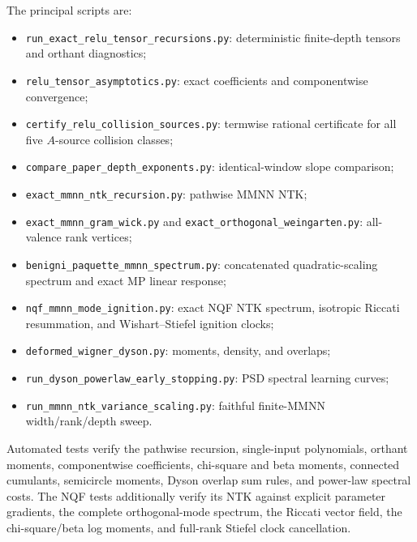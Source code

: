 \documentclass{article}
\begin{document}
The principal scripts are:
\begin{itemize}[leftmargin=1.4em]
\item \texttt{run\_exact\_relu\_tensor\_recursions.py}: deterministic
finite-depth tensors and orthant diagnostics;
\item \texttt{relu\_tensor\_asymptotics.py}: exact coefficients and
componentwise convergence;
\item \texttt{certify\_relu\_collision\_sources.py}: termwise rational
certificate for all five \(A\)-source collision classes;
\item \texttt{compare\_paper\_depth\_exponents.py}: identical-window slope
comparison;
\item \texttt{exact\_mmnn\_ntk\_recursion.py}: pathwise MMNN NTK;
\item \texttt{exact\_mmnn\_gram\_wick.py} and
\texttt{exact\_orthogonal\_weingarten.py}: all-valence rank vertices;
\item \texttt{benigni\_paquette\_mmnn\_spectrum.py}: concatenated
quadratic-scaling spectrum and exact MP linear response;
\item \texttt{nqf\_mmnn\_mode\_ignition.py}: exact NQF NTK spectrum,
isotropic Riccati resummation, and Wishart--Stiefel ignition clocks;
\item \texttt{deformed\_wigner\_dyson.py}: moments, density, and overlaps;
\item \texttt{run\_dyson\_powerlaw\_early\_stopping.py}: PSD spectral
learning curves;
\item \texttt{run\_mmnn\_ntk\_variance\_scaling.py}: faithful finite-MMNN
width/rank/depth sweep.
\end{itemize}
Automated tests verify the pathwise recursion, single-input polynomials,
orthant moments, componentwise coefficients, chi-square and beta moments,
connected cumulants, semicircle moments, Dyson overlap sum rules, and
power-law spectral costs.  The NQF tests additionally verify its NTK against
explicit parameter gradients, the complete orthogonal-mode spectrum, the
Riccati vector field, the chi-square/beta log moments, and full-rank Stiefel
clock cancellation.
\end{document}
